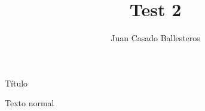 \documentclass [a4paper] {article}
\title{Test 2}
\author{Juan Casado Ballesteros}
\begin{document}
\maketitle
Título

Texto normal
\end{document}
